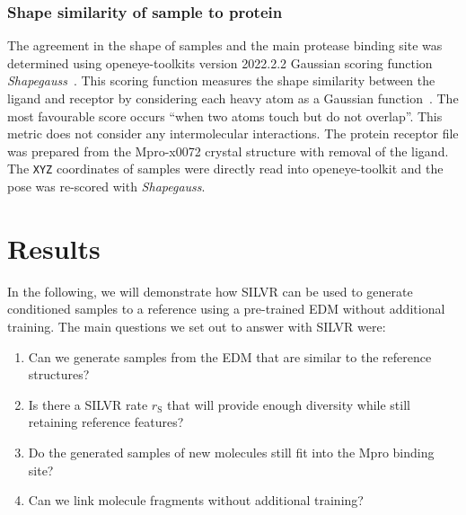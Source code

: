 \documentclass[journal=jacsat,manuscript=article]{achemso}
\begin{document}
\subsubsection{Shape similarity of sample to protein}
The agreement in the shape of samples and the main protease binding site was determined using openeye-toolkits version 2022.2.2 Gaussian scoring function \textit{Shapegauss}~\cite{openeyescientificsoftwareinc.oedocking,kelley2015posit}. This scoring function measures the shape similarity between the ligand and receptor by considering each heavy atom as a Gaussian function~\cite{mcgann2003gaussian}. The most favourable score occurs “when two atoms touch but do not overlap”.  This metric does not consider any intermolecular interactions. The protein receptor file was prepared from the Mpro-x0072 crystal structure with removal of the ligand. The \texttt{XYZ} coordinates of samples were directly read into openeye-toolkit and the pose was re-scored with \textit{Shapegauss}. 


\section{Results}
In the following, we will demonstrate how SILVR can be used to generate conditioned samples to a reference using a pre-trained EDM without additional training. The main questions we set out to answer with SILVR were:
\begin{enumerate}
    \item Can we generate samples from the EDM that are similar to the reference structures?
    \item Is there a SILVR rate $r_{\mathrm{S}}$ that will provide enough diversity while still retaining reference features?
    \item Do the generated samples of new molecules still fit into the Mpro binding site?
    \item Can we link molecule fragments without additional training?
\end{enumerate}
\end{document}
